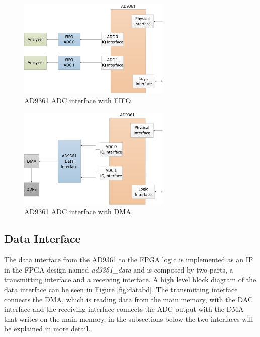 \begin{figure}[htbp]
    \centering
    \includegraphics[width=0.65\textwidth]{./figures/adc_fifo}
    \caption{ AD9361 ADC interface with FIFO.
    \label{fig:ad9361rxfifo}}
\end{figure}

\begin{figure}[htbp]
    \centering
    \includegraphics[width=0.65\textwidth]{./figures/adc_dma}
    \caption{ AD9361 ADC interface with DMA.
    \label{fig:ad9361rxdma}}
\end{figure}


\subsection{Data Interface}
\label{subs:dataif}

The data interface from the AD9361 to the FPGA logic is implemented as an IP in
the FPGA design named \emph{ad9361\_data} and is composed by two parts, a
transmitting interface and a receiving interface. A high level block diagram of
the data interface can be seen in Figure \ref{fig:databd}. The transmitting
interface connects the DMA, which is reading data from the main memory, with the
DAC interface and the receiving interface connects the ADC output with the DMA
that writes on the main memory, in the subsections below the two interfaces will
be explained in more detail.

